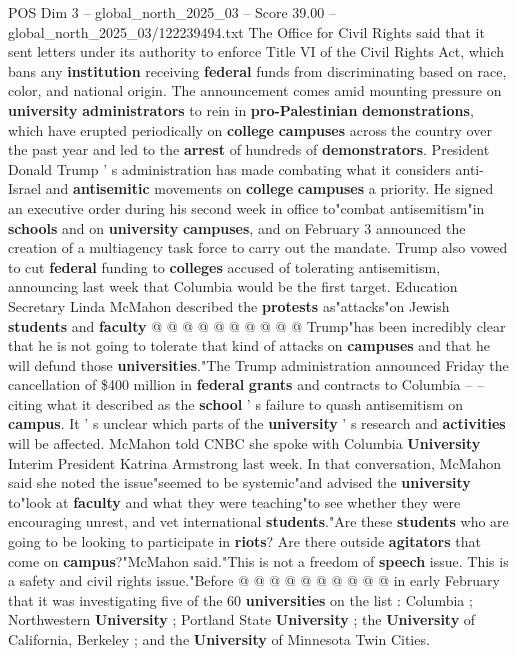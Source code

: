 \begin{textsample}{POS Dim 3 – global\_north\_2025\_03 – Score 39.00 – global\_north\_2025\_03/122239494.txt}  \label{ex:f3_pos_022}
The Office for Civil Rights said that it sent letters under its authority to enforce Title VI of the Civil Rights Act, which bans any \textbf{institution} receiving \textbf{federal} funds from discriminating based on race, color, and national origin.
The announcement comes amid mounting pressure on \textbf{university} \textbf{administrators} to rein in \textbf{pro-Palestinian} \textbf{demonstrations}, which have erupted periodically on \textbf{college} \textbf{campuses} across the country over the past year and led to the \textbf{arrest} of hundreds of \textbf{demonstrators}.
President Donald Trump ' s administration has made combating what it considers anti-Israel and \textbf{antisemitic} movements on \textbf{college} \textbf{campuses} a priority.
He signed an executive order during his second week in office to"combat antisemitism"in \textbf{schools} and on \textbf{university} \textbf{campuses}, and on February 3 announced the creation of a multiagency task force to carry out the mandate.
Trump also vowed to cut \textbf{federal} funding to \textbf{colleges} accused of tolerating antisemitism, announcing last week that Columbia would be the first target.
Education Secretary Linda McMahon described the \textbf{protests} as"attacks"on Jewish \textbf{students} and \textbf{faculty} @ @ @ @ @ @ @ @ @ @ Trump"has been incredibly clear that he is not going to tolerate that kind of attacks on \textbf{campuses} and that he will defund those \textbf{universities}."The Trump administration announced Friday the cancellation of \$400 million in \textbf{federal} \textbf{grants} and contracts to Columbia -- -- citing what it described as the \textbf{school} ' s failure to quash antisemitism on \textbf{campus}.
It ' s unclear which parts of the \textbf{university} ' s research and \textbf{activities} will be affected.
McMahon told CNBC she spoke with Columbia \textbf{University} Interim President Katrina Armstrong last week.
In that conversation, McMahon said she noted the issue"seemed to be systemic"and advised the \textbf{university} to"look at \textbf{faculty} and what they were teaching"to see whether they were encouraging unrest, and vet international \textbf{students}."Are these \textbf{students} who are going to be looking to participate in \textbf{riots}?
Are there outside \textbf{agitators} that come on \textbf{campus}?"McMahon said."This is not a freedom of \textbf{speech} issue.
This is a safety and civil rights issue."Before @ @ @ @ @ @ @ @ @ @ in early February that it was investigating five of the 60 \textbf{universities} on the list : Columbia ; Northwestern \textbf{University} ; Portland State \textbf{University} ; the \textbf{University} of California, Berkeley ; and the \textbf{University} of Minnesota Twin Cities.

\end{textsample}
